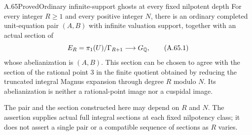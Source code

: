 \begin{statement}{A.65}{Proved}{Ordinary infinite-support ghosts at every fixed nilpotent depth}
For every integer $R\geq1$ and every positive integer $N$, there is an
ordinary completed unit-equation pair $(A,B)$ with infinite valuation
support, together with an actual section of
\[
 E_R=\pi_1(U)/\Gamma_{R+1}\longrightarrow G_\mathbb Q,
 \tag{A.65.1}
\]
whose abelianization is $(A,B)$.  This section can be chosen to agree with
the section of the rational point $3$ in the finite quotient obtained by
reducing the truncated integral Magnus expansion through degree $R$
modulo $N$.  Its abelianization is neither a rational-point image nor a
cuspidal image.

The pair and the section constructed here may depend on $R$ and $N$.
The assertion supplies actual full integral sections at each fixed
nilpotency class; it does not assert a single pair or a compatible
sequence of sections as $R$ varies.
\end{statement}
